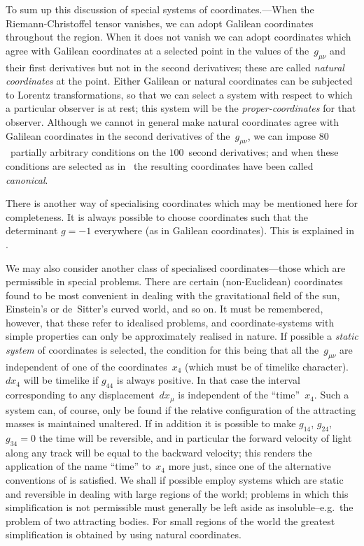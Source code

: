\documentclass[12pt]{book}
\begin{document}
To sum up this discussion of special systems of coordinates.---When the
Riemann-Christoffel tensor vanishes, we can adopt Galilean coordinates
throughout the region. When it does not vanish we can adopt coordinates
which agree with Galilean coordinates at a selected point in the values of the~$g_{\mu\nu}$
and their first derivatives but not in the second derivatives; these are
called \emph{natural coordinates} at the point. Either Galilean or natural coordinates
can be subjected to Lorentz transformations, so that we can select a system
with respect to which a particular observer is at rest; this system will be the
\emph{proper-coordinates} for that observer. Although we cannot in general make
%
natural coordinates agree with Galilean coordinates in the second derivatives
of the~$g_{\mu\nu}$, we can impose $80$~partially arbitrary conditions on the $100$~second
derivatives; and when these conditions are selected as in~ the resulting
coordinates have been called \emph{canonical}.

There is another way of specialising coordinates which may be mentioned
here for completeness. It is always possible to choose coordinates such that
the determinant $g = -1$ everywhere (as in Galilean coordinates). This is
explained in .

We may also consider another class of specialised coordinates---those
which are permissible in special problems. There are certain (non-Euclidean)
coordinates found to be most convenient in dealing with the gravitational
field of the sun, Einstein's or de~Sitter's curved world, and so on. It must be
remembered, however, that these refer to idealised problems, and coordinate-systems
%
%
with simple properties can only be approximately realised in nature.
%
%
If possible a \emph{static system} of coordinates is selected, the condition for this
being that all the~$g_{\mu\nu}$ are independent of one of the coordinates~$x_{4}$ (which
must be of timelike character\footnotemark).\footnotetext
  {$dx_{4}$ will be timelike if $g_{44}$ is always positive.}
In that case the interval corresponding to
any displacement~$dx_{\mu}$ is independent of the ``time''~$x_{4}$. Such a system can,
of course, only be found if the relative configuration of the attracting masses
is maintained unaltered. If in addition it is possible to make $g_{14}$, $g_{24}$, $g_{34} = 0$
the time will be reversible, and in particular the forward velocity of light
along any track will be equal to the backward velocity; this renders the
application of the name ``time'' to~$x_{4}$ more just, since one of the alternative
conventions of  is satisfied. We shall if possible employ systems which
are static and reversible in dealing with large regions of the world; problems
in which this simplification is not permissible must generally be left aside as
insoluble--e.g.\ the problem of two attracting bodies. For small regions of the
world the greatest simplification is obtained by using natural coordinates.
\end{document}
